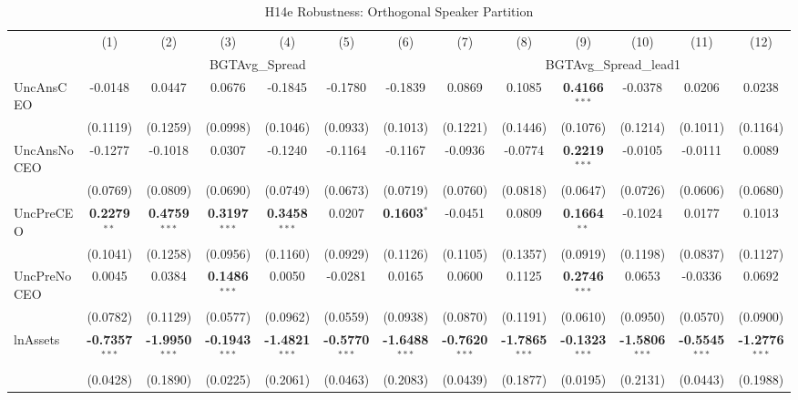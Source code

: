 \begin{landscape}
\begin{table}[H]
\setlength{\tabcolsep}{3pt}
\renewcommand{\arraystretch}{0.85}
\centering
\caption{H14e Robustness: Orthogonal Speaker Partition}
\label{tab:h14e_robust}
\scriptsize
\begin{tabular}{lcccccccccccc}
\toprule
 & (1) & (2) & (3) & (4) & (5) & (6) & (7) & (8) & (9) & (10) & (11) & (12) \\
 & \multicolumn{6}{c}{BGTAvg\_Spread} & \multicolumn{6}{c}{BGTAvg\_Spread\_lead1} \\
\cmidrule(lr){2-7} \cmidrule(lr){8-13}
\midrule
UncAnsCEO & -0.0148 & 0.0447 & 0.0676 & -0.1845 & -0.1780 & -0.1839 & 0.0869 & 0.1085 & \textbf{0.4166}$^{***}$ & -0.0378 & 0.0206 & 0.0238 \\
 & (0.1119) & (0.1259) & (0.0998) & (0.1046) & (0.0933) & (0.1013) & (0.1221) & (0.1446) & (0.1076) & (0.1214) & (0.1011) & (0.1164) \\
UncAnsNoCEO & -0.1277 & -0.1018 & 0.0307 & -0.1240 & -0.1164 & -0.1167 & -0.0936 & -0.0774 & \textbf{0.2219}$^{***}$ & -0.0105 & -0.0111 & 0.0089 \\
 & (0.0769) & (0.0809) & (0.0690) & (0.0749) & (0.0673) & (0.0719) & (0.0760) & (0.0818) & (0.0647) & (0.0726) & (0.0606) & (0.0680) \\
UncPreCEO & \textbf{0.2279}$^{**}$ & \textbf{0.4759}$^{***}$ & \textbf{0.3197}$^{***}$ & \textbf{0.3458}$^{***}$ & 0.0207 & \textbf{0.1603}$^{*}$ & -0.0451 & 0.0809 & \textbf{0.1664}$^{**}$ & -0.1024 & 0.0177 & 0.1013 \\
 & (0.1041) & (0.1258) & (0.0956) & (0.1160) & (0.0929) & (0.1126) & (0.1105) & (0.1357) & (0.0919) & (0.1198) & (0.0837) & (0.1127) \\
UncPreNoCEO & 0.0045 & 0.0384 & \textbf{0.1486}$^{***}$ & 0.0050 & -0.0281 & 0.0165 & 0.0600 & 0.1125 & \textbf{0.2746}$^{***}$ & 0.0653 & -0.0336 & 0.0692 \\
 & (0.0782) & (0.1129) & (0.0577) & (0.0962) & (0.0559) & (0.0938) & (0.0870) & (0.1191) & (0.0610) & (0.0950) & (0.0570) & (0.0900) \\
\midrule
lnAssets & \textbf{-0.7357}$^{***}$ & \textbf{-1.9950}$^{***}$ & \textbf{-0.1943}$^{***}$ & \textbf{-1.4821}$^{***}$ & \textbf{-0.5770}$^{***}$ & \textbf{-1.6488}$^{***}$ & \textbf{-0.7620}$^{***}$ & \textbf{-1.7865}$^{***}$ & \textbf{-0.1323}$^{***}$ & \textbf{-1.5806}$^{***}$ & \textbf{-0.5545}$^{***}$ & \textbf{-1.2776}$^{***}$ \\
 & (0.0428) & (0.1890) & (0.0225) & (0.2061) & (0.0463) & (0.2083) & (0.0439) & (0.1877) & (0.0195) & (0.2131) & (0.0443) & (0.1988) \\

\end{tabular}
\end{table}
\end{landscape}
